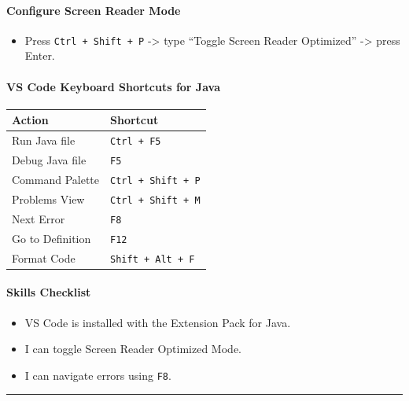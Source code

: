 \documentclass[
  justified,
  openright,
]{tufte-book}
\let\subsubsection\paragraph
\let\paragraph\paragraph
\let\subsubsection\paragraph
\let\paragraph\paragraph
\providecommand{\tightlist}{%
  \setlength{\itemsep}{0pt}\setlength{\parskip}{0pt}}
\begin{document}
\subsubsection{Configure Screen Reader
Mode}\label{configure-screen-reader-mode}

\begin{itemize}
\tightlist
\item
  Press \texttt{Ctrl\ +\ Shift\ +\ P} -\textgreater{} type ``Toggle
  Screen Reader Optimized'' -\textgreater{} press Enter.
\end{itemize}

\subsubsection{VS Code Keyboard Shortcuts for
Java}\label{vs-code-keyboard-shortcuts-for-java}

{\def\LTcaptype{none} %
\begin{longtable}[]{@{}ll@{}}
\toprule\noalign{}
Action & Shortcut \\
\midrule\noalign{}
\endhead
\bottomrule\noalign{}
\endlastfoot
Run Java file & \texttt{Ctrl\ +\ F5} \\
Debug Java file & \texttt{F5} \\
Command Palette & \texttt{Ctrl\ +\ Shift\ +\ P} \\
Problems View & \texttt{Ctrl\ +\ Shift\ +\ M} \\
Next Error & \texttt{F8} \\
Go to Definition & \texttt{F12} \\
Format Code & \texttt{Shift\ +\ Alt\ +\ F} \\
\end{longtable}
}

\subsubsection{Skills Checklist}\label{skills-checklist-1}

\begin{itemize}
\tightlist
\item[$\square$]
  VS Code is installed with the Extension Pack for Java.
\item[$\square$]
  I can toggle Screen Reader Optimized Mode.
\item[$\square$]
  I can navigate errors using \texttt{F8}.
\end{itemize}

\begin{center}\rule{0.5\linewidth}{0.5pt}\end{center}
\end{document}
